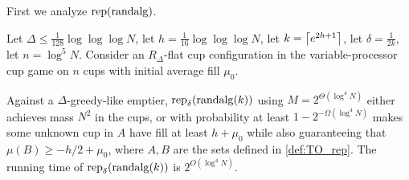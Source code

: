 First we analyze $\operatorname{\text{\textup{rep}}}(\operatorname{\text{\textup{randalg}}})$.
\begin{lemma}
  \label{lem:TO_obliviousBase}
  Let $\Delta \le \frac{1}{128}\log\log\log N$, let $h =
  \frac{1}{16}\log\log\log N$, let $k=\left\lceil e^{2h+1} \right\rceil$, let
  $\delta = \frac{1}{2k}$, let $n =
  \log^5 N$. Consider an $R_\Delta$-flat cup configuration in
  the variable-processor cup game on $n$ cups with initial
  average fill $\mu_0$.

  Against a $\Delta$-greedy-like emptier,
  $\operatorname{\text{\textup{rep}}}_{\delta}(\operatorname{\text{\textup{randalg}}}(k))$ using $M = 2^{\Theta(\log^4 N)}$
  either achieves mass $N^2$ in the cups, or with probability at
  least $1-2^{-\Omega(\log^4 N)}$ makes some unknown cup in $A$
  have fill at least $h+\mu_0$ while also
  guaranteeing that $\mu(B) \ge -h/2 + \mu_0$, where $A,B$ are
  the sets defined in \cref{def:TO_rep}. The running time of
  $\operatorname{\text{\textup{rep}}}_{\delta}(\operatorname{\text{\textup{randalg}}}(k))$ is $2^{O(\log^4 N)}$.
\end{lemma}
